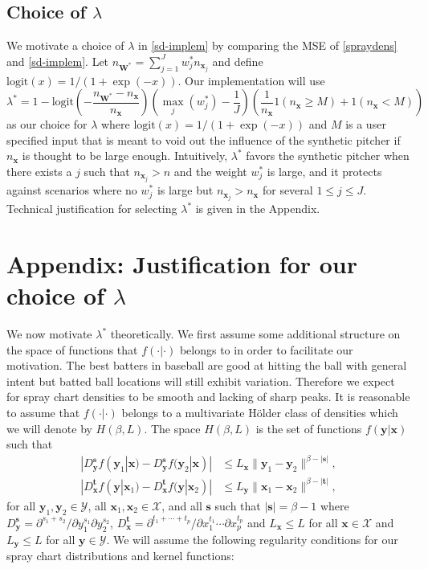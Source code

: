 \documentclass[11pt]{article}
\newcommand{\Y}{\mathcal{Y}}
\newcommand{\X}{\mathcal{X}}
\newcommand{\W}{\textbf{W}}
\newcommand{\y}{\textbf{y}}
\newcommand{\x}{\textbf{x}}
\newcommand{\s}{\textbf{s}}
\newcommand{\tbf}{\textbf{t}}
\newcommand{\Wstar}{\W^{\textstyle{*}}}
\newcommand{\wstar}{w^{\textstyle{*}}}
\newcommand{\lamstar}{\lambda^{\textstyle{*}}}
\begin{document}
\subsection{Choice of $\lambda$}

We motivate a choice of $\lambda$ in \eqref{sd-implem} by comparing the MSE of \eqref{spraydens} and \eqref{sd-implem}. Let $n_{\Wstar} = \sum_{j=1}^J \wstar_j n_{\x_j}$ and define $\text{logit}(x) = 1/(1 + \exp(-x))$. Our implementation will use 
$$
  \lamstar = 1 - \text{logit}\left(-\frac{n_{\Wstar} - n_\x}{n_\x}\right)
    \left(\max_j(\wstar_j) - \frac{1}{J}\right)
    \left(\frac{1}{n_\x}1(n_\x \geq M) + 1(n_\x < M) \right)
$$
as our choice for $\lambda$ where $\text{logit}(x) = 1/(1 + \exp(-x))$ and $M$ is a user specified input that is meant to void out the influence of the synthetic pitcher if $n_\x$ is thought to be large enough. Intuitively, $\lamstar$ favors the synthetic pitcher when there exists a $j$ such that $n_{\x_j} > n$ and the weight $\wstar_j$ is large, and it protects against scenarios where no $\wstar_j$ is large but $n_{\x_j} > n_{\x}$ for several $1 \leq j \leq J$. Technical justification for selecting $\lamstar$ is given in the Appendix.



\section*{Appendix: Justification for our choice of $\lambda$}

We now motivate $\lamstar$ theoretically. We first assume some additional structure on the space of functions that $f(\cdot|\cdot)$ belongs to in order to facilitate our motivation. The best batters in baseball are good at hitting the ball with general intent but batted ball locations will still exhibit variation. Therefore we expect for spray chart densities to be smooth and lacking of sharp peaks. It is reasonable to assume that $f(\cdot|\cdot)$ belongs to a multivariate H{\"o}lder class of densities which we will denote by $H(\beta,L)$. The space $H(\beta,L)$ is the set of functions $f(\y|\x)$ such that 
\begin{align*}
|D_{\y}^\s f(\y_1|\x) - D_{\y}^\s f(\y_2|\x)| &\leq L_\x\|\y_1 - \y_2\|^{\beta - |\s|}, \\
|D_{\x}^\tbf f(\y|\x_1) - D_{\x}^\tbf f(\y|\x_2)| &\leq L_\y\|\x_1 - \x_2\|^{\beta - |\tbf|}, 
\end{align*}
for all $\y_1,\y_2 \in \Y$, all $\x_1,\x_2 \in \X$, and all $\s$ such that $|\s| = \beta - 1$ where
$D_{\y}^\s = \partial^{s_1 + s_2}/\partial y_1^{s_1} \partial y_2^{s_2}$, 
$D_{\x}^\tbf = \partial^{t_1 + \cdots + t_p}/\partial x_1^{t_1} \cdots \partial x_p^{t_p}$ and $L_\x \leq L$ for all $\x \in \X$ and $L_\y \leq L$ for all $\y \in \Y$.
We will assume the following regularity conditions for our spray chart distributions and kernel functions: 
\end{document}

